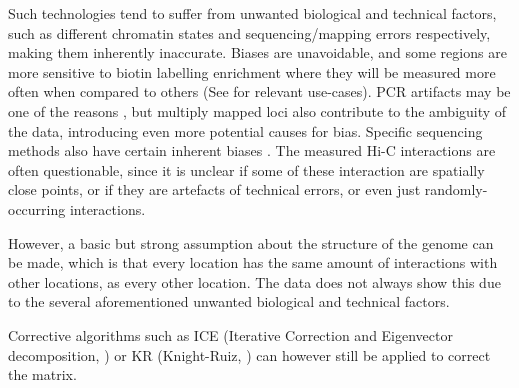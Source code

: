 Such technologies tend to suffer from unwanted biological and technical factors, such as different chromatin
states \cite{pmid19693276} and sequencing/mapping errors \cite{pmid21646344} respectively,
making them inherently inaccurate. Biases are unavoidable, and
some regions are more sensitive to biotin labelling
enrichment where they will be
measured more often when compared to others (See  for relevant use-cases).
PCR artifacts may be one of the
reasons \cite{wingett2015hicup}, but multiply mapped loci also contribute to the ambiguity of the data,
introducing even more potential causes for bias. Specific sequencing methods also
have certain inherent biases \cite{aird2011analyzing}. The measured Hi-C interactions are
often questionable, since it is unclear if some of these interaction are spatially close points, or if
they are artefacts of technical errors, or even just randomly-occurring interactions.

However, a basic but strong assumption about the structure of the genome can be
made, which is that every location has the same amount of interactions with
other locations, as every other location. The data does not always show this due to
the several aforementioned unwanted biological and technical factors.

Corrective algorithms such as ICE \cite{imakaev2012iterative} (Iterative Correction and Eigenvector
decomposition, ) or KR \cite{knight2013fast} (Knight-Ruiz,
) can however still be applied to correct the matrix.



